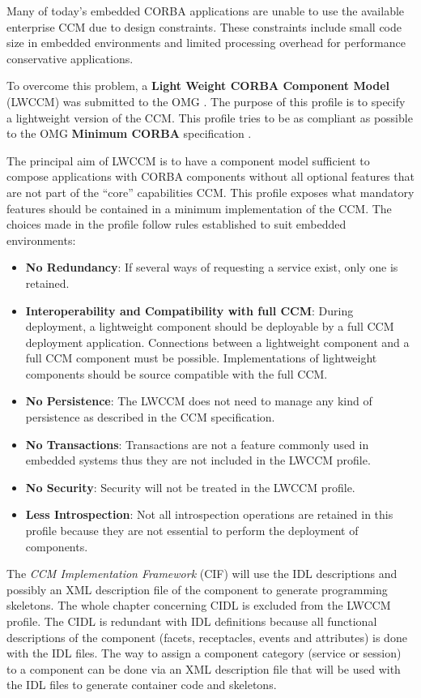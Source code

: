 Many of today's embedded CORBA applications are unable to use the available 
enterprise CCM due to design constraints.
These constraints include small code size in embedded environments and 
limited processing overhead for performance conservative applications.

To overcome this problem, a {\bf Light Weight CORBA Component Model} (LWCCM)
was submitted to the OMG \cite{LwCCM-Specification}.
The purpose of this profile is to specify a lightweight version of the CCM.
This profile tries to be as compliant as possible to the OMG 
{\bf Minimum CORBA} specification \cite{Minimum_CORBA}.


The principal aim of LWCCM is to have a component model sufficient to compose
applications with CORBA components without all optional features that are
not part of the ``core'' capabilities CCM.
This profile exposes what mandatory features should be contained in a 
minimum implementation of the CCM. 
The choices made in the profile follow rules established to suit embedded
environments:
\begin{itemize}
\item {\bf No Redundancy}:
If several ways of requesting a service exist, only one is retained.

\item {\bf Interoperability and Compatibility with full CCM}:
During deployment, a lightweight component should be deployable by a full
CCM deployment application. Connections between a lightweight component
and a full CCM component must be possible.
Implementations of lightweight components should be source compatible
with the full CCM.

\item {\bf No Persistence}:
The LWCCM does not need to manage any kind of persistence as described in the
CCM specification. 

\item {\bf No Transactions}:
Transactions are not a feature commonly used in embedded systems thus they
are not included in the LWCCM profile.

\item {\bf No Security}:
Security will not be treated in the LWCCM profile.

\item {\bf Less Introspection}:
Not all introspection operations are retained in this profile because they
are not essential to perform the deployment of components.
\end{itemize}

\noindent
The {\it CCM Implementation Framework} (CIF) will use the IDL descriptions and
possibly an XML description file of the component to generate programming skeletons.
The whole chapter concerning CIDL is excluded from the LWCCM profile.
The CIDL is redundant with IDL definitions because all functional descriptions
of the component (facets, receptacles, events and attributes) is done with the IDL files.
The way to assign a component category (service or session) to a component
can be done via an XML description file that will be used with the IDL files to
generate container code and skeletons.


